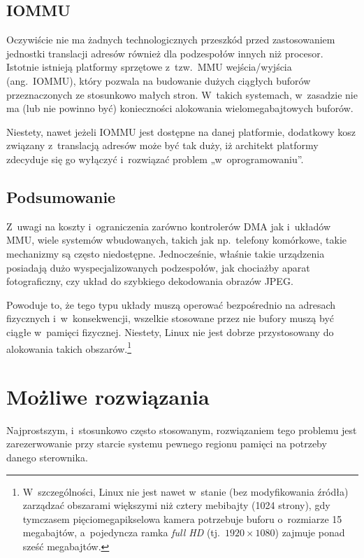 \subsection{IOMMU}

Oczywiście nie ma żadnych technologicznych przeszkód przed
zastosowaniem jednostki translacji adresów również dla podzespołów
innych niż procesor.  Istotnie istnieją platformy sprzętowe
z~tzw.\ MMU wejścia/wyjścia (ang.\ IOMMU), który pozwala na budowanie
dużych ciągłych buforów przeznaczonych ze stosunkowo małych stron.
W~takich systemach, w~zasadzie nie ma (lub nie powinno być)
konieczności alokowania wielomegabajtowych buforów.

Niestety, nawet jeżeli IOMMU jest dostępne na danej platformie,
dodatkowy kosz związany z~translacją adresów może być tak duży, iż
architekt platformy zdecyduje się go wyłączyć i~rozwiązać problem
„w~oprogramowaniu”.

\subsection{Podsumowanie}

Z~uwagi na koszty i~ograniczenia zarówno kontrolerów DMA jak i~układów
MMU, wiele systemów wbudowanych, takich jak np.\ telefony komórkowe,
takie mechanizmy są często niedostępne.  Jednocześnie, właśnie takie
urządzenia posiadają dużo wyspecjalizowanych podzespołów, jak
chociażby aparat fotograficzny, czy układ do szybkiego dekodowania
obrazów JPEG.

Powoduje to, że tego typu układy muszą operować bezpośrednio na
adresach fizycznych i~w~konsekwencji, wszelkie stosowane przez nie
bufory muszą być ciągłe w~pamięci fizycznej.  Niestety, Linux nie jest
dobrze przystosowany do alokowania takich
obszarów.\footnote{W~szczególności, Linux nie jest nawet w~stanie (bez
  modyfikowania źródła) zarządzać obszarami większymi niż cztery
  mebibajty (1024 strony), gdy tymczasem pięciomegapikselowa kamera
  potrzebuje buforu o~rozmiarze 15 megabajtów, a~pojedyncza ramka {\it
    full HD} (tj.\ $1920 \times 1080$) zajmuje ponad sześć megabajtów.}


\section{Możliwe rozwiązania}

Najprostszym, i~stosunkowo często stosowanym, rozwiązaniem tego
problemu jest zarezerwowanie przy starcie systemu pewnego regionu
pamięci na potrzeby danego sterownika.

